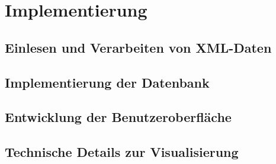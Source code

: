 
\newpage
\section{Implementierung}
\label{Implementierung}

\subsection{Einlesen und Verarbeiten von XML-Daten}

\subsection{Implementierung der Datenbank}

\subsection{Entwicklung der Benutzeroberfläche}

\subsection{Technische Details zur Visualisierung}
